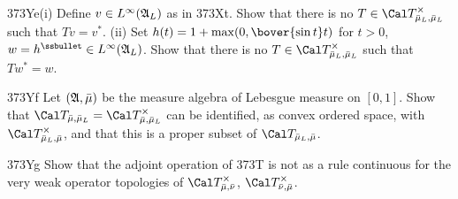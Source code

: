 {\spheader 373Ye(i) Define $v\in L^{\infty}(\frak A_L)$ as in 373Xt.
Show that there is no $T\in\Cal T^{\times}_{\bar\mu_L,\bar\mu_L}$ such
that $Tv=v^*$.   (ii) Set $h(t)=1+\max(0,\bover{\sin t}t)$ for $t>0$,
$w=h^{\ssbullet}\in L^{\infty}(\frak A_L)$.
Show that there is no $T\in\Cal T^{\times}_{\bar\mu_L,\bar\mu_L}$ such
that $Tw^*=w$.
     
\spheader 373Yf Let $(\frak A,\bar\mu)$ be the measure algebra of
Lebesgue
measure on $[0,1]$.   Show that $\Cal T_{\bar\mu,\bar\mu_L}=\Cal
T^{\times}_{\bar\mu,\bar\mu_L}$ can be identified, as convex ordered
space,
with $\Cal T^{\times}_{\bar\mu_L,\bar\mu}$, and that this is a proper
subset
of $\Cal T_{\bar\mu_L,\bar\mu}$.
     
\spheader 373Yg Show that the adjoint operation of 373T is not as a rule
continuous for the very weak operator topologies of $\Cal
T^{\times}_{\bar\mu,\bar\nu}$, $\Cal T^{\times}_{\bar\nu,\bar\mu}$.
}%
     
